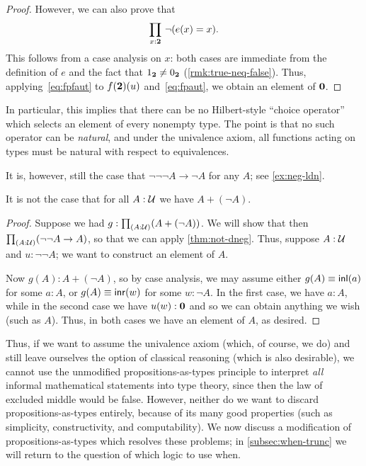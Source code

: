 \begin{proof}
  However, we can also prove that
  \begin{equation}
    \prd{x:\bool} \neg(e(x)=x).\label{eq:fpfaut}
  \end{equation}
  This follows from a case analysis on $x$: both cases are immediate from the definition of $e$ and the fact that ${1_{\mathbf{2}}}\neq{0_{\ensuremath{\mathbf{2}}}}$ (\autoref{rmk:true-neq-false}).
  Thus, applying~\eqref{eq:fpfaut} to $f(\mathbf{2})(u)$ and~\eqref{eq:fpaut}, we obtain an element of $\mathbf{0}$.
\end{proof}

\begin{rmk}
  In particular, this implies that there can be no Hilbert-style ``choice operator'' which selects an element of every nonempty type.
  The point is that no such operator can be \emph{natural}, and under the univalence axiom, all functions acting on types must be natural with respect to equivalences.
\end{rmk}

\begin{rmk}
  It is, however, still the case that $\neg\neg\neg A \to \neg A$ for any $A$; see \autoref{ex:neg-ldn}.
\end{rmk}

\begin{cor}\label{thm:not-lem}
  It is not the case that for all $A:\mathcal{U}$ we have $A+(\neg A)$.
\end{cor}
\begin{proof}
  Suppose we had $g:\prd{A:\UU} (A+(\neg A))$.
  We will show that then $\prd{A:\UU} (\neg\neg A \to A)$, so that we can apply \autoref{thm:not-dneg}.
  Thus, suppose $A:\mathcal{U}$ and $u:\neg\neg A$; we want to construct an element of $A$.

  Now $g(A):A+(\neg A)$, so by case analysis, we may assume either $g(A)\equiv {\mathsf{inl}}(a)$ for some $a:A$, or $g(A)\equiv {\mathsf{inr}}(w)$ for some $w:\neg A$.
  In the first case, we have $a:A$, while in the second case we have $u(w):\mathbf{0}$ and so we can obtain anything we wish (such as $A$).
  Thus, in both cases we have an element of $A$, as desired.
\end{proof}

Thus, if we want to assume the univalence axiom (which, of course, we do) and still leave ourselves the option of classical reasoning (which is also desirable), we cannot use the unmodified propositions-as-types principle to interpret \emph{all} informal mathematical statements into type theory, since then the law of excluded middle would be false.
However, neither do we want to discard propositions-as-types entirely, because of its many good properties (such as simplicity, constructivity, and computability).
We now discuss a modification of propositions-as-types which resolves these problems; in \autoref{subsec:when-trunc} we will return to the question of which logic to use when.
%
%
%

